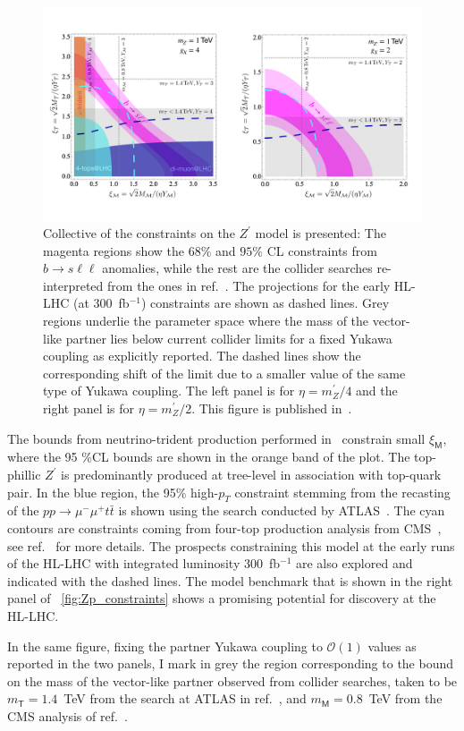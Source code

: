 \begin{figure}[htpb!]
	\includegraphics[scale=0.235]{figures/Zprime_constraint_CLu.pdf}
	\caption{ Collective of the constraints on the $Z^\prime$ model is presented: The magenta regions show the  $68\%$ and $ 95\%$ CL  constraints from $ b \to s \ell \ell$ anomalies, while the rest are the collider searches re-interpreted from the ones in ref.~\cite{Camargo-Molina:2018cwu}. The projections for the early HL-LHC  (at 300~fb$^{-1}$) constraints are shown as dashed lines. Grey regions underlie the parameter space where the mass of the vector-like partner lies below current collider limits for a fixed Yukawa coupling as explicitly reported. The dashed lines show the corresponding shift of the limit due to a smaller value of the same type of Yukawa coupling. The left panel is for $\eta = m_Z^\prime /4$
		and the right panel is for $\eta = m_Z^\prime /2$. This figure is published in~\cite{Alasfar:2020mne}.}
	\label{fig:Zp_constraints}
\end{figure}
\par The bounds from neutrino-trident production performed in~\cite{Mishra:1991bv} constrain small $\xi_{\mathsf{M}}$, where the 95 \%CL bounds are shown in the orange band of the plot.  The top-phillic $Z^{\prime}$  is predominantly produced at tree-level in association with top-quark pair. In the blue region, the 95\% high-$p_{T}$ constraint stemming from the recasting of the $p p \to \mu^{-} \mu^{+} t \bar{t} $ is shown using the search conducted by ATLAS~\cite{Aaboud:2017buh,ATLAS-CONF-2019-001}. The cyan contours are constraints coming from four-top production analysis from CMS~\cite{Sirunyan:2017roi}, see ref.~\cite{Camargo-Molina:2018cwu} for more details.  The prospects  constraining this model at the early runs of the HL-LHC  with integrated luminosity 300~fb$^{-1}$ are also explored and indicated with the dashed lines. The model benchmark that is shown in the right panel of ~\autoref{fig:Zp_constraints} shows a promising potential for discovery at the HL-LHC. 
\par In the same figure, fixing the partner Yukawa coupling to  $\mathcal{O}(1)$ values as reported in the two panels, I mark in grey the region corresponding to the bound on the mass of the vector-like partner observed from collider searches, taken to be $m_{\mathsf{T}} = 1.4$~TeV from the search at ATLAS in ref.~\cite{Aaboud:2018uek}, and $m_{\mathsf{M}} = 0.8$~TeV from the CMS analysis of ref.~\cite{Sirunyan:2019ofn}.
